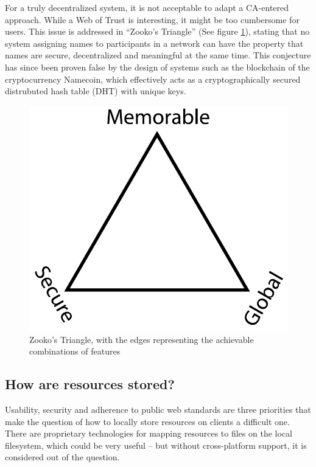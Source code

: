 For a truly decentralized system, it is not acceptable to adapt a CA-entered approach. While a Web of Trust is interesting, it might be too cumbersome for users. This issue is addressed in “Zooko’s Triangle” (See figure \ref{fig:zooko}), stating that no system assigning names to participants in a network can have the property that names are secure, decentralized and meaningful at the same time. This conjecture has since been proven false by the design of systems such as the blockchain of the cryptocurrency Namecoin, which effectively acts as a cryptographically secured distrubuted hash table (DHT) with unique keys.
\begin{figure}[h]
\centering
\includegraphics[width=\textwidth,height=0.2\paperheight,keepaspectratio
]{figures/Zooko_s_Triangle}
\caption{Zooko's Triangle, with the edges representing the achievable combinations of features \cite{Zooko:2001:Online}}
\label{fig:zooko}
\end{figure}

\subsection {How are resources stored?}
Usability, security and adherence to public web standards are three priorities that make the question of how to locally store resources on clients a difficult one. There are proprietary technologies for mapping resources to files on the local filesystem, which could be very useful – but without cross-platform support, it is considered out of the question.

